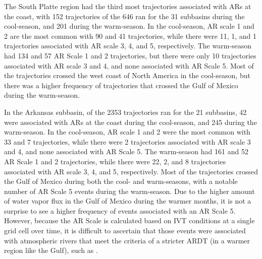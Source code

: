 \documentclass[draft]{agujournal2019}
\begin{document}
The South Platte region had the third most trajectories associated with ARs at the coast, with 152 trajectories of the 646 ran for the 31 subbasins during the cool-season, and 201 during the warm-season. In the cool-season, AR scale 1 and 2 are the most common with 90 and 41 trajectories, while there were 11, 1, and 1 trajectories associated with AR scale 3, 4, and 5, respectively. The warm-season had 134 and 57 AR Scale 1 and 2 trajectories, but there were only 10 trajectories associated with AR scale 3 and 4, and none associated with AR Scale 5. Most of the trajectories crossed the west coast of North America in the cool-season, but there was a higher frequency of trajectories that crossed the Gulf of Mexico during the warm-season.

In the Arkansas subbasin, of the 2353 trajectories ran for the 21 subbasins, 42 were associated with ARs at the coast during the cool-season, and 245 during the warm-season. In the cool-season, AR scale 1 and 2 were the most common with 33 and 7 trajectories, while there were 2 trajectories associated with AR scale 3 and 4, and none associated with AR Scale 5. The warm-season had 161 and 52 AR Scale 1 and 2 trajectories, while there were 22, 2, and 8 trajectories associated with AR scale 3, 4, and 5, respectively. Most of the trajectories crossed the Gulf of Mexico during both the cool- and warm-seasons, with a notable number of AR Scale 5 events during the warm-season. Due to the higher amount of water vapor flux in the Gulf of Mexico during the warmer months, it is not a surprise to see a higher frequency of events associated with an AR Scale 5. However, because the AR Scale is calculated based on IVT conditions at a single grid cell over time, it is difficult to ascertain that those events were associated with atmospheric rivers that meet the criteria of a stricter ARDT (in a warmer region like the Gulf), such as . 
\end{document}
